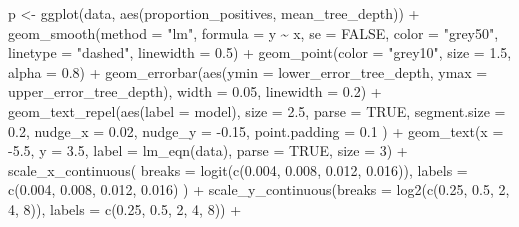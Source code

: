 \documentclass[
  11pt,
  oneside]{book}
\newenvironment{Shaded}{\begin{snugshade}}{\end{snugshade}}
\newcommand{\AttributeTok}[1]{\textcolor[rgb]{0.77,0.63,0.00}{#1}}
\newcommand{\ConstantTok}[1]{\textcolor[rgb]{0.00,0.00,0.00}{#1}}
\newcommand{\DecValTok}[1]{\textcolor[rgb]{0.00,0.00,0.81}{#1}}
\newcommand{\FloatTok}[1]{\textcolor[rgb]{0.00,0.00,0.81}{#1}}
\newcommand{\FunctionTok}[1]{\textcolor[rgb]{0.00,0.00,0.00}{#1}}
\newcommand{\NormalTok}[1]{#1}
\newcommand{\OtherTok}[1]{\textcolor[rgb]{0.56,0.35,0.01}{#1}}
\newcommand{\SpecialCharTok}[1]{\textcolor[rgb]{0.00,0.00,0.00}{#1}}
\newcommand{\StringTok}[1]{\textcolor[rgb]{0.31,0.60,0.02}{#1}}
\begin{document}
\begin{Shaded}
\begin{Highlighting}[]
\NormalTok{p }\OtherTok{\textless{}{-}} \FunctionTok{ggplot}\NormalTok{(data, }\FunctionTok{aes}\NormalTok{(proportion\_positives, mean\_tree\_depth)) }\SpecialCharTok{+}
  \FunctionTok{geom\_smooth}\NormalTok{(}\AttributeTok{method =} \StringTok{"lm"}\NormalTok{, }\AttributeTok{formula =}\NormalTok{ y }\SpecialCharTok{\textasciitilde{}}\NormalTok{ x, }\AttributeTok{se =} \ConstantTok{FALSE}\NormalTok{, }\AttributeTok{color =} \StringTok{"grey50"}\NormalTok{, }\AttributeTok{linetype =} \StringTok{"dashed"}\NormalTok{, }\AttributeTok{linewidth =} \FloatTok{0.5}\NormalTok{) }\SpecialCharTok{+}
  \FunctionTok{geom\_point}\NormalTok{(}\AttributeTok{color =} \StringTok{"grey10"}\NormalTok{, }\AttributeTok{size =} \FloatTok{1.5}\NormalTok{, }\AttributeTok{alpha =} \FloatTok{0.8}\NormalTok{) }\SpecialCharTok{+}
  \FunctionTok{geom\_errorbar}\NormalTok{(}\FunctionTok{aes}\NormalTok{(}\AttributeTok{ymin =}\NormalTok{ lower\_error\_tree\_depth, }\AttributeTok{ymax =}\NormalTok{ upper\_error\_tree\_depth), }\AttributeTok{width =} \FloatTok{0.05}\NormalTok{, }\AttributeTok{linewidth =} \FloatTok{0.2}\NormalTok{) }\SpecialCharTok{+}
  \FunctionTok{geom\_text\_repel}\NormalTok{(}\FunctionTok{aes}\NormalTok{(}\AttributeTok{label =}\NormalTok{ model),}
    \AttributeTok{size =} \FloatTok{2.5}\NormalTok{, }\AttributeTok{parse =} \ConstantTok{TRUE}\NormalTok{, }\AttributeTok{segment.size =} \FloatTok{0.2}\NormalTok{,}
    \AttributeTok{nudge\_x =} \FloatTok{0.02}\NormalTok{, }\AttributeTok{nudge\_y =} \SpecialCharTok{{-}}\FloatTok{0.15}\NormalTok{, }\AttributeTok{point.padding =} \FloatTok{0.1}
\NormalTok{  ) }\SpecialCharTok{+}
  \FunctionTok{geom\_text}\NormalTok{(}\AttributeTok{x =} \SpecialCharTok{{-}}\FloatTok{5.5}\NormalTok{, }\AttributeTok{y =} \FloatTok{3.5}\NormalTok{, }\AttributeTok{label =} \FunctionTok{lm\_eqn}\NormalTok{(data), }\AttributeTok{parse =} \ConstantTok{TRUE}\NormalTok{, }\AttributeTok{size =} \DecValTok{3}\NormalTok{) }\SpecialCharTok{+}
  \FunctionTok{scale\_x\_continuous}\NormalTok{(}
    \AttributeTok{breaks =} \FunctionTok{logit}\NormalTok{(}\FunctionTok{c}\NormalTok{(}\FloatTok{0.004}\NormalTok{, }\FloatTok{0.008}\NormalTok{, }\FloatTok{0.012}\NormalTok{, }\FloatTok{0.016}\NormalTok{)),}
    \AttributeTok{labels =} \FunctionTok{c}\NormalTok{(}\FloatTok{0.004}\NormalTok{, }\FloatTok{0.008}\NormalTok{, }\FloatTok{0.012}\NormalTok{, }\FloatTok{0.016}\NormalTok{)}
\NormalTok{  ) }\SpecialCharTok{+}
  \FunctionTok{scale\_y\_continuous}\NormalTok{(}\AttributeTok{breaks =} \FunctionTok{log2}\NormalTok{(}\FunctionTok{c}\NormalTok{(}\FloatTok{0.25}\NormalTok{, }\FloatTok{0.5}\NormalTok{, }\DecValTok{2}\NormalTok{, }\DecValTok{4}\NormalTok{, }\DecValTok{8}\NormalTok{)), }\AttributeTok{labels =} \FunctionTok{c}\NormalTok{(}\FloatTok{0.25}\NormalTok{, }\FloatTok{0.5}\NormalTok{, }\DecValTok{2}\NormalTok{, }\DecValTok{4}\NormalTok{, }\DecValTok{8}\NormalTok{)) }\SpecialCharTok{+}

\end{Highlighting}
\end{Shaded}
\end{document}
